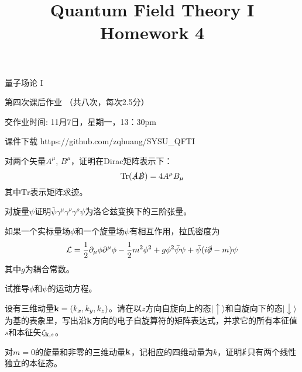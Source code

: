 \documentclass[CJK]{beamer}
\title{Quantum Field Theory I \\ Homework 4}
\author{}
\date{}
\begin{document}
\begin{frame}
 
\begin{center}
\begin{Large}
\bch
量子场论 I 

{\vskip 0.3in}

第四次课后作业 （共八次，每次2.5分）

交作业时间: 11月7日，星期一，13：30pm

\ech
\end{Large}
\end{center}

\vskip 0.2in

\bch
课件下载
\ech
https://github.com/zqhuang/SYSU\_QFTI

\end{frame}

\begin{frame}
\bch
对两个矢量$A^\mu$, $B^\mu$，证明在Dirac矩阵表示下：
$$\mathrm{Tr}(\slashed{A}\slashed{B}) = 4A^\mu B_\mu$$
其中$\mathrm{Tr}$表示矩阵求迹。
\ech
\end{frame}

\begin{frame}
\bch
对旋量$\psi$证明$\bar{\psi}\gamma^\mu\gamma^\nu\gamma^\rho\psi$为洛仑兹变换下的三阶张量。
\ech
\end{frame}

\begin{frame}
\bch
如果一个实标量场$\phi$和一个旋量场$\psi$有相互作用，拉氏密度为
$${\mathcal{L}} = \frac{1}{2}\partial_\mu\phi\partial^\mu\phi - \frac{1}{2}m^2\phi^2 + g\phi^2\bar\psi\psi + \bar\psi(i\slashed{\partial}-m)\psi$$
其中$g$为耦合常数。

试推导$\phi$和$\psi$的运动方程。
\ech
\end{frame}


\begin{frame}
\bch
设有三维动量${\mathbf{k}} = (k_x, k_y, k_z)$。请在以$z$方向自旋向上的态$|\uparrow\rangle$和自旋向下的态$|\downarrow\rangle$为基的表象里，写出沿${\mathbf{k}}$方向的电子自旋算符的矩阵表达式，并求它的所有本征值$s$和本征矢$\zeta_{{\mathbf{k}},s}$。
\ech
\end{frame}


\begin{frame}
\bch
对$m=0$的旋量和非零的三维动量${\mathbf{k}}$，记相应的四维动量为$k$，证明$\slashed{k}$只有两个线性独立的本征态。 
\ech
\end{frame}
\end{document}

